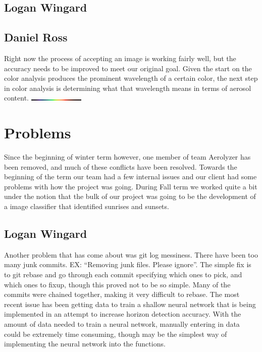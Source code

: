 \documentclass[onecolumn, draftclsnofoot,10pt, compsoc]{IEEEtran}
\begin{document}
\begin{singlespace}
		\subsection{Logan Wingard}
			
		\subsection{Daniel Ross}
			Right now the process of accepting an image is working fairly well, but the accuracy needs to be improved to meet our original goal.
			Given the start on the color analysis produces the prominent wavelength of a certain color, the next step in color analysis is determining what that wavelength means in terms of aerosol content.
			\includegraphics[height=0.05cm,natwidth=370,natheight=7]{images/Visible_Color_Spectrum.png}


	\section{Problems}
		Since the beginning of winter term however, one member of team Aerolyzer has been removed, and much of these conflicts have been resolved.
		Towards the beginning of the term our team had a few internal issues and our client had some problems with how the project was going.
		During Fall term we worked quite a bit under the notion that the bulk of our project was going to be the development of a image classifier that identified sunrises and sunsets.
		\subsection{Logan Wingard}
			Another problem that has come about was git log messiness.
			There have been too many junk commits.
            EX: ``Removing junk files. Please ignore''.
			The simple fix is to git rebase and go through each commit specifying which ones to pick, and which ones to fixup, though this proved not to be so simple.
			Many of the commits were chained together, making it very difficult to rebase.
			The most recent issue has been getting data to train a shallow neural network that is being implemented in an attempt to increase horizon detection accuracy.
			With the amount of data needed to train a neural network, manually entering in data could be extremely time consuming, though may be the simplest way of implementing the neural network into the functions.

\end{singlespace}
\end{document}
